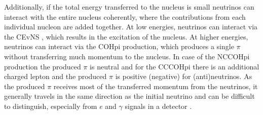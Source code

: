 




Additionally, if the total energy transferred to the nucleus is small neutrinos can interact with the entire nucleus coherently, where the contributions from each individual nucleon are added together. At low energies, neutrinos can interact via the \gls{CEvNS} \cite{CEvENSFirstObservation2017.pdf}, which results in the excitation of the nucleus. At higher energies, neutrinos can interact via the \gls{COHpi} production, which produces a single $\pi$ without transferring much momentum to the nucleus. In case of the \gls{NC}\gls{COHpi} production the produced $\pi$ is neutral and for the \gls{CC}\gls{COHpi} there is an additional charged lepton and the produced $\pi$ is positive (negative) for (anti)neutrinos. As the produced $\pi$ receives most of the transferred momentum from the neutrinos, it generally travels in the same direction as the initial neutrino and can be difficult to distinguish, especially from $e$ and $\gamma$ signals in a detector \cite{NeutrinoIntOverview2022.pdf}.

